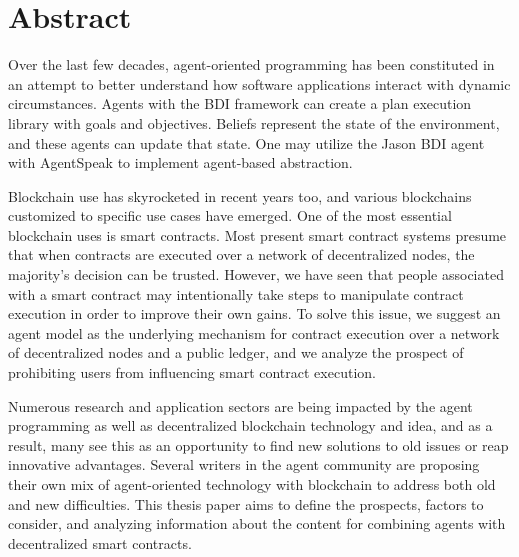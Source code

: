 \ifx\doclanguage\english
\chapter*{Abstract}
	\vspace{2.5cm}
   Over the last few decades, agent-oriented programming has been constituted in an attempt to better understand how software applications interact with dynamic circumstances. Agents with the \ac{BDI} framework can create a plan execution library with goals and objectives. Beliefs represent the state of the environment, and these agents can update that state. One may utilize the Jason \ac{BDI} agent with AgentSpeak to implement agent-based abstraction.
   
   \vspace{.5cm}
   
   Blockchain use has skyrocketed in recent years too, and various blockchains customized to specific use cases have emerged. One of the most essential blockchain uses is smart contracts. Most present smart contract systems presume that when contracts are executed over a network of decentralized nodes, the majority's decision can be trusted. However, we have seen that people associated with a smart contract may intentionally take steps to manipulate contract execution in order to improve their own gains. To solve this issue, we suggest an agent model as the underlying mechanism for contract execution over a network of decentralized nodes and a public ledger, and we analyze the prospect of prohibiting users from influencing smart contract execution.
   
    \vspace{.5cm}
    
    Numerous research and application sectors are being impacted by the agent programming as well as decentralized  blockchain technology and idea, and as a result, many see this as an opportunity to find new solutions to old issues or reap innovative advantages. Several writers in the agent community are proposing their own mix of agent-oriented technology with blockchain to address both old and new difficulties. This thesis paper aims to define the prospects, factors to consider, and analyzing information about the content for combining agents with decentralized smart contracts.
    
    
